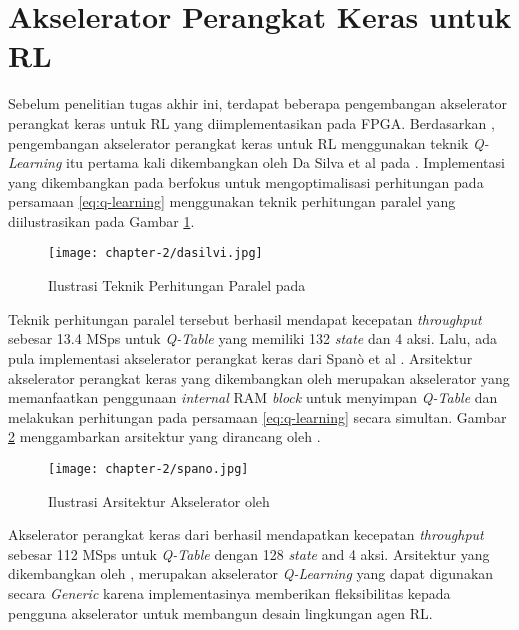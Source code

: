 \section{Akselerator Perangkat Keras untuk \acl{RL}}
\label{sec:accelerator-researches}

Sebelum penelitian tugas akhir ini, terdapat beberapa pengembangan akselerator perangkat keras untuk \ac{RL} yang diimplementasikan pada \ac{FPGA}. Berdasarkan \parencite{sutisna2023faraneq}, pengembangan akselerator perangkat keras untuk \ac{RL} menggunakan teknik \textit{Q-Learning} itu pertama kali dikembangkan oleh Da Silva et al pada \parencite{dasilva2019parallel}. Implementasi yang dikembangkan pada \parencite{dasilva2019parallel} berfokus untuk mengoptimalisasi perhitungan pada persamaan \ref{eq:q-learning} menggunakan teknik perhitungan paralel yang diilustrasikan pada Gambar \ref{fig:ilustrasi-dasilvi}.

\begin{figure}[h]
	\centering
	\texttt{[image: chapter-2/dasilvi.jpg]}
	\caption{Ilustrasi Teknik Perhitungan Paralel pada \parencite{dasilva2019parallel}}
	\label{fig:ilustrasi-dasilvi}
\end{figure}

Teknik perhitungan paralel tersebut berhasil mendapat kecepatan \textit{throughput} sebesar 13.4  \ac{MSps} untuk \textit{Q-Table} yang memiliki 132 \textit{state} dan 4 aksi. Lalu, ada pula implementasi akselerator perangkat keras dari Spanò et al \parencite{spano2019efficient}. Arsitektur akselerator perangkat keras yang dikembangkan oleh \parencite{spano2019efficient} merupakan akselerator yang memanfaatkan penggunaan \textit{internal} \ac{RAM} \textit{block} untuk menyimpan \textit{Q-Table} dan melakukan perhitungan pada persamaan \ref{eq:q-learning} secara simultan. Gambar \ref{fig:ilustrasi-spano} menggambarkan arsitektur yang dirancang oleh \parencite{spano2019efficient}.

\begin{figure}[h]
	\centering
	\texttt{[image: chapter-2/spano.jpg]}
	\caption{Ilustrasi Arsitektur Akselerator oleh \parencite{spano2019efficient}}
	\label{fig:ilustrasi-spano}
\end{figure}

Akselerator perangkat keras dari \parencite{spano2019efficient} berhasil mendapatkan kecepatan \textit{throughput} sebesar 112 MSps untuk \textit{Q-Table} dengan 128 \textit{state} and 4 aksi. Arsitektur yang dikembangkan oleh \parencite{spano2019efficient}, merupakan akselerator \textit{Q-Learning} yang dapat digunakan secara \textit{Generic} karena implementasinya memberikan fleksibilitas kepada pengguna akselerator untuk membangun desain lingkungan agen \ac{RL}.

